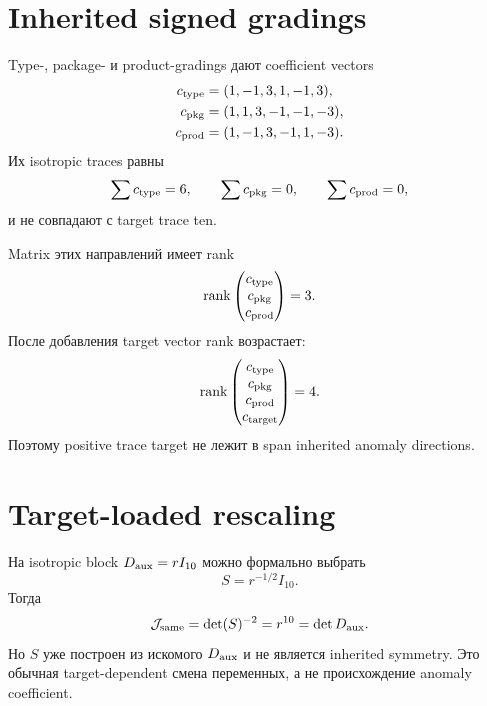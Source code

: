 \section{Inherited signed gradings}

Type-, package- и product-gradings дают coefficient vectors
\begin{align}
 c_{\rm type}&=(1,-1,3,1,-1,3),\label{eq:v9-kms-anomaly-type-vector}\\
 c_{\rm pkg}&=(1,1,3,-1,-1,-3),\label{eq:v9-kms-anomaly-package-vector}\\
 c_{\rm prod}&=(1,-1,3,-1,1,-3).\label{eq:v9-kms-anomaly-product-vector}
\end{align}
Их isotropic traces равны
\begin{equation}
 \sum c_{\rm type}=6,
 \qquad \sum c_{\rm pkg}=0,
 \qquad \sum c_{\rm prod}=0,
 \label{eq:v9-kms-anomaly-inherited-traces}
\end{equation}
и не совпадают с target trace ten.

Matrix этих направлений имеет rank
\begin{equation}
 \operatorname{rank}\begin{pmatrix}c_{\rm type}\\c_{\rm pkg}\\c_{\rm prod}\end{pmatrix}=3.
 \label{eq:v9-kms-anomaly-inherited-rank}
\end{equation}
После добавления target vector rank возрастает:
\begin{equation}
 \operatorname{rank}\begin{pmatrix}
 c_{\rm type}\\c_{\rm pkg}\\c_{\rm prod}\\c_{\rm target}
 \end{pmatrix}=4.
 \label{eq:v9-kms-anomaly-augmented-rank}
\end{equation}
Поэтому positive trace target не лежит в span inherited anomaly directions.

\section{Target-loaded rescaling}

На isotropic block $D_{\rm aux}=rI_{10}$ можно формально выбрать
\begin{equation}
 S=r^{-1/2}I_{10}.
 \label{eq:v9-kms-anomaly-loaded-rescaling}
\end{equation}
Тогда
\begin{equation}
 \mathcal J_{\rm same}=\det(S)^{-2}=r^{10}=\det D_{\rm aux}.
 \label{eq:v9-kms-anomaly-loaded-jacobian}
\end{equation}
Но $S$ уже построен из искомого $D_{\rm aux}$ и не является inherited
symmetry. Это обычная target-dependent смена переменных, а не происхождение
anomaly coefficient.

